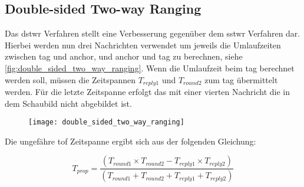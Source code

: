 %
%
\subsection{Double-sided Two-way Ranging}
\label{subsec:double_sided_two_way_ranging}

Das \Gls{dstwr} Verfahren stellt eine Verbesserung gegenüber dem \Gls{sstwr} Verfahren dar. Hierbei werden nun drei Nachrichten verwendet um jeweils die Umlaufzeiten zwischen \Gls{tag} und \Gls{anchor}, und \Gls{anchor} und \Gls{tag} zu berechnen, siehe \autoref{fig:double_sided_two_way_ranging}. Wenn die Umlaufzeit beim \Gls{tag} berechnet werden soll, müssen die Zeitspannen $T_{reply1}$ und $T_{round2}$ zum \Gls{tag} übermittelt werden. Für die letzte Zeitspanne erfolgt das mit einer vierten Nachricht die in dem Schaubild nicht abgebildet ist. \cite{decawave2015twr, decawave2016dw1kusermanual}

\begin{figure}
	\centering
	\texttt{[image: double\_sided\_two\_way\_ranging]}
	\label{fig:double_sided_two_way_ranging}
\end{figure}

Die ungefähre \Gls{tof} Zeitspanne ergibt sich aus der folgenden Gleichung:

\begin{equation}
T_{prop} = \frac{\left(T_{round1}\times T_{round2}-T_{reply1}\times T_{reply2}\right)}{\left(T_{round1}+T_{round2}+T_{reply1}+T_{reply2}\right)}
\end{equation}

